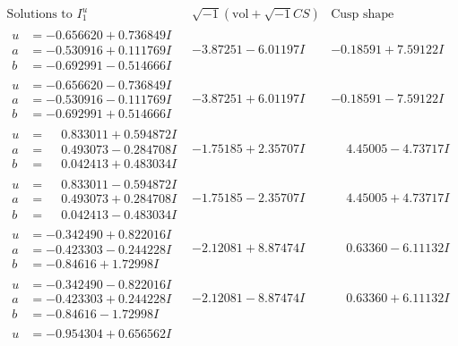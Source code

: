 \documentclass[1p]{elsarticle_modified}
\theoremstyle{definition}
\newcommand{\I}{\sqrt{-1}}
\begin{document}
$$\begin{array}{c|c|c}  
\text{Solutions to }I^u_{1}& \I (\text{vol} + \sqrt{-1}CS) & \text{Cusp shape}\\
 \hline 
\begin{aligned}
u &= -0.656620 + 0.736849 I \\
a &= -0.530916 + 0.111769 I \\
b &= -0.692991 - 0.514666 I\end{aligned}
 & -3.87251 - 6.01197 I & -0.18591 + 7.59122 I \\ \hline\begin{aligned}
u &= -0.656620 - 0.736849 I \\
a &= -0.530916 - 0.111769 I \\
b &= -0.692991 + 0.514666 I\end{aligned}
 & -3.87251 + 6.01197 I & -0.18591 - 7.59122 I \\ \hline\begin{aligned}
u &= \phantom{-}0.833011 + 0.594872 I \\
a &= \phantom{-}0.493073 - 0.284708 I \\
b &= \phantom{-}0.042413 + 0.483034 I\end{aligned}
 & -1.75185 + 2.35707 I & \phantom{-}4.45005 - 4.73717 I \\ \hline\begin{aligned}
u &= \phantom{-}0.833011 - 0.594872 I \\
a &= \phantom{-}0.493073 + 0.284708 I \\
b &= \phantom{-}0.042413 - 0.483034 I\end{aligned}
 & -1.75185 - 2.35707 I & \phantom{-}4.45005 + 4.73717 I \\ \hline\begin{aligned}
u &= -0.342490 + 0.822016 I \\
a &= -0.423303 - 0.244228 I \\
b &= -0.84616 + 1.72998 I\end{aligned}
 & -2.12081 + 8.87474 I & \phantom{-}0.63360 - 6.11132 I \\ \hline\begin{aligned}
u &= -0.342490 - 0.822016 I \\
a &= -0.423303 + 0.244228 I \\
b &= -0.84616 - 1.72998 I\end{aligned}
 & -2.12081 - 8.87474 I & \phantom{-}0.63360 + 6.11132 I \\ \hline\begin{aligned}
u &= -0.954304 + 0.656562 I \\

\end{aligned}
\end{array}$$
\end{document}
